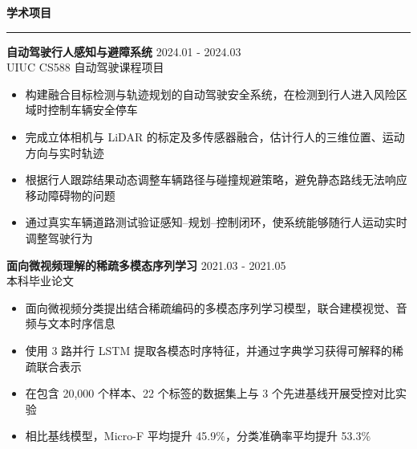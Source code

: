 \documentclass[10pt,a4paper]{article}
\begin{document}
\vspace{0.5em}
\noindent\textbf{学术项目}\\[-0.2em]
\rule{\textwidth}{1pt}
\textbf{自动驾驶行人感知与避障系统} \hfill 2024.01 - 2024.03\\
UIUC CS588 自动驾驶课程项目\vspace{-8pt}
\begin{itemize}[noitemsep]
    \item 构建融合目标检测与轨迹规划的自动驾驶安全系统，在检测到行人进入风险区域时控制车辆安全停车
    \item 完成立体相机与 LiDAR 的标定及多传感器融合，估计行人的三维位置、运动方向与实时轨迹
    \item 根据行人跟踪结果动态调整车辆路径与碰撞规避策略，避免静态路线无法响应移动障碍物的问题
    \item 通过真实车辆道路测试验证感知--规划--控制闭环，使系统能够随行人运动实时调整驾驶行为
\end{itemize}

\noindent\textbf{面向微视频理解的稀疏多模态序列学习} \hfill 2021.03 - 2021.05\\
本科毕业论文\vspace{-8pt}
\begin{itemize}[noitemsep]
    \item 面向微视频分类提出结合稀疏编码的多模态序列学习模型，联合建模视觉、音频与文本时序信息
    \item 使用 3 路并行 LSTM 提取各模态时序特征，并通过字典学习获得可解释的稀疏联合表示
    \item 在包含 20,000 个样本、22 个标签的数据集上与 3 个先进基线开展受控对比实验
    \item 相比基线模型，Micro-F 平均提升 45.9\%，分类准确率平均提升 53.3\%
\end{itemize}

  
\end{document}
